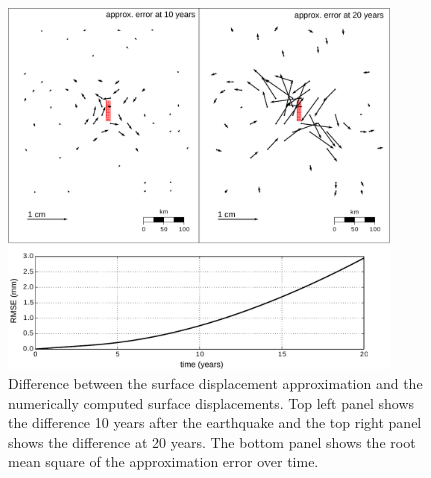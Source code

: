 \documentclass[12pt]{article}
\begin{document}
\begin{figure}[h!]\label{figure6}
  \centering
  \includegraphics[width=0.9\textwidth]{FinalFigures/Figure7.pdf}
  \caption{Difference between the surface displacement approximation
    and the numerically computed surface displacements.  Top left
    panel shows the difference 10 years after the earthquake and the
    top right panel shows the difference at 20 years.  The bottom
    panel shows the root mean square of the approximation error over
    time.}
  \label{figure 6}
\end{figure}
\end{document}
